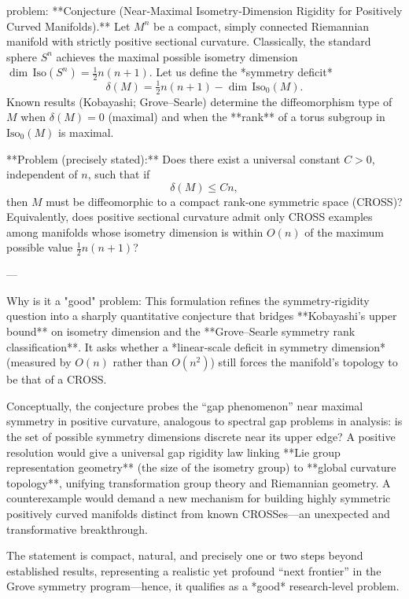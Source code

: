 problem:  
**Conjecture (Near‑Maximal Isometry‑Dimension Rigidity for Positively Curved Manifolds).**  
Let \( M^n \) be a compact, simply connected Riemannian manifold with strictly positive sectional curvature.  
Classically, the standard sphere \(S^n\) achieves the maximal possible isometry dimension \( \dim\,\mathrm{Iso}(S^n) = \frac{1}{2}n(n+1) \).  
Let us define the *symmetry deficit*  
\[
\delta(M) = \tfrac{1}{2}n(n+1) - \dim\,\mathrm{Iso}_0(M).
\]  
Known results (Kobayashi; Grove–Searle) determine the diffeomorphism type of \(M\) when \(\delta(M)=0\) (maximal) and when the **rank** of a torus subgroup in \(\mathrm{Iso}_0(M)\) is maximal.

**Problem (precisely stated):**  
Does there exist a universal constant \(C>0\), independent of \(n\), such that if  
\[
\delta(M) \le Cn,
\]
then \(M\) must be diffeomorphic to a compact rank‑one symmetric space (CROSS)?  
Equivalently, does positive sectional curvature admit only CROSS examples among manifolds whose isometry dimension is within \(O(n)\) of the maximum possible value \( \tfrac{1}{2}n(n+1) \)?  

---

Why is it a "good" problem:  
This formulation refines the symmetry‑rigidity question into a sharply quantitative conjecture that bridges **Kobayashi's upper bound** on isometry dimension and the **Grove–Searle symmetry rank classification**. It asks whether a *linear‑scale deficit in symmetry dimension* (measured by \(O(n)\) rather than \(O(n^2)\)) still forces the manifold's topology to be that of a CROSS.  

Conceptually, the conjecture probes the “gap phenomenon” near maximal symmetry in positive curvature, analogous to spectral gap problems in analysis: is the set of possible symmetry dimensions discrete near its upper edge?  
A positive resolution would give a universal gap rigidity law linking **Lie group representation geometry** (the size of the isometry group) to **global curvature topology**, unifying transformation group theory and Riemannian geometry.  
A counterexample would demand a new mechanism for building highly symmetric positively curved manifolds distinct from known CROSSes—an unexpected and transformative breakthrough.

The statement is compact, natural, and precisely one or two steps beyond established results, representing a realistic yet profound “next frontier” in the Grove symmetry program—hence, it qualifies as a *good* research‑level problem.